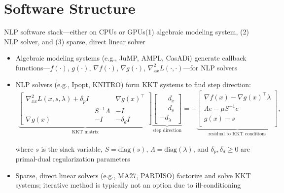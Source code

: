 \documentclass[aspectratio=169,11pt]{beamer}
\begin{document}
\section{Software Structure}
\newcommand{\kktsystem}{%
  \begin{align*}
    \underbrace{
    \begin{bmatrix}
      \nabla^2_{x x} L(x,s,\lambda) + \delta_p I & & \nabla g(x)^\top
      \\ & S^{-1}\Lambda &  -I
      \\ \nabla g(x) & -I &  - \delta_d I
    \end{bmatrix}
    }_{\text{KKT matrix}}
    \underbrace{
    \begin{bmatrix}
      \phantom{-}d_x \\
      \phantom{-}d_s \\
      -d_\lambda
    \end{bmatrix}}_{\text{step direction}} =
    -\underbrace{\begin{bmatrix}
      \nabla f(x) - \nabla g(x)^\top \lambda\\
      \Lambda e - \mu S^{-1}e \\
      g(x) - s\\
    \end{bmatrix}}_{\text{residual to KKT conditions}},
  \end{align*}
}
\begin{frame}{NLP software stack---either on CPUs or GPUs}{{(1) algebraic modeling system}, {(2) NLP solver}, and {(3) sparse, direct linear solver}}
  \begin{itemize}
  \item \alert{Algebraic modeling systems} (e.g., JuMP, AMPL, CasADi) generate \alert{callback functions---$f(\cdot)$, $g(\cdot)$, $\nabla f(\cdot)$, $\nabla g(\cdot)$, $\nabla^2_{xx} L(\cdot,\cdot)$}---for \alert{NLP solvers}
  \item \alert{NLP solvers} (e.g., Ipopt, KNITRO) form \alert{KKT systems} to find step direction:
  \kktsystem
    where $s$ is the slack variable, $S=\text{diag}(s)$, $\Lambda=\text{diag}(\lambda)$, and $\delta_p,\delta_d\geq 0$ are primal-dual regularization parameters
  \item \alert{Sparse, direct linear solvers} (e.g., MA27, PARDISO) factorize and solve KKT systems; iterative method is typically not an option due to ill-conditioning
  \end{itemize}
\end{frame}
\end{document}

